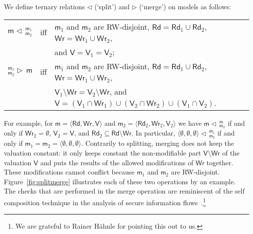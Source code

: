\documentclass{llncs}
\newcommand{\modl}{\mathsf m}
\newcommand{\mrg}[3]{ ^{#2}_{#3} \triangleright \, #1 }
\newcommand{\splt}[3]{ #1 \triangleleft \, ^{#2}_{#3} }
\newcommand{\readset}{\mathsf{Rd}}
\newcommand{\valuset}{\mathsf{V}}
\newcommand{\writeset}{\mathsf{Wr}}
\newcommand{\tuple}[1]{ \langle #1 \rangle}
\begin{document}
We define ternary relations $\triangleleft$ (`split') and $\triangleright$ (`merge') on models as follows:
\begin{center}\begin{tabular}{lll}
$\splt{\modl}{\modl_1} {\modl_2} $ & iff & $\modl_1$ and $\modl_2$ are RW-disjoint, 
$\readset = \readset_1 \cup \readset_2 $, $\writeset = \writeset_1 \cup \writeset_2$,  \\&&  and $\valuset = \valuset_1 = \valuset_2$;
\\
$\mrg{\modl}{\modl_1} {\modl_2} $ & iff  & $\modl_1$ and $\modl_2$ are RW-disjoint, 
$\readset = \readset_1 \cup \readset_2$, $\writeset = \writeset_1 \cup \writeset_2$,  \\&&
$\valuset_1 \setminus \writeset = \valuset_2 \setminus \writeset $, and 
$\valuset = (\valuset_1 \cap \writeset_1) \cup (\valuset_2 \cap \writeset_2) \cup (\valuset_1 \cap \valuset_2) $. 
\end{tabular}\end{center}
For example, for 
$\modl = \tuple{ \readset,\writeset,\valuset }$ and 
$\modl_2 = \tuple{ \readset_2,\writeset_2,\valuset_2 }$ 
we have $\splt{\modl}{\modl} {\modl_2} $ if and only if
$\writeset_2 = \emptyset$, $\valuset_2 = \valuset$, and
$\readset_2 \subseteq \readset \setminus \writeset$.
In particular, 
$\splt{ \tuple{\emptyset,\emptyset,\emptyset} }{\modl_1}{\modl_2}$ if and only if 
$\modl_1 = \modl_2 = \tuple{\emptyset,\emptyset,\emptyset}$. 
%
Contrarily to splitting, merging does not keep the valuation constant: 
it only keeps constant the non-modifiable part $\valuset \setminus \writeset$ of the valuation $\valuset $ and 
puts the results of the allowed modifications of $\writeset$ together. 
These modifications cannot conflict because $\modl_1$ and $\modl_2 $ are RW-disjoint. 
Figure~\ref{fig:splitmerge} illustrates each of these two operations by an example. 
%
The checks that are performed in the merge operation are reminiscent of the self composition technique in the analysis of secure information flows~\cite{DarvasEtal05,Scheben2016}.\footnote{%
We are grateful to Rainer H\"ahnle for pointing this out to us. 
}
\end{document}
